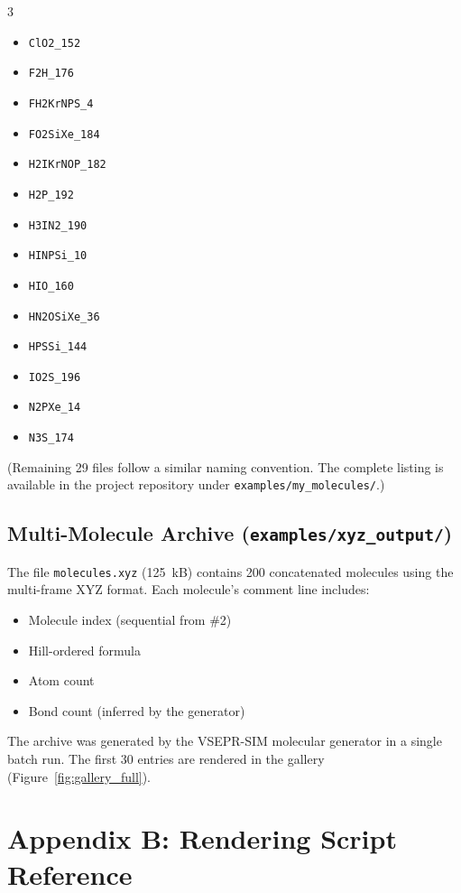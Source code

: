 \documentclass[11pt,a4paper]{article}
\begin{document}
\begin{multicols}{3}
\begin{itemize}[nosep,leftmargin=1em]
  \item \texttt{ClO2\_152}
  \item \texttt{F2H\_176}
  \item \texttt{FH2KrNPS\_4}
  \item \texttt{FO2SiXe\_184}
  \item \texttt{H2IKrNOP\_182}
  \item \texttt{H2P\_192}
  \item \texttt{H3IN2\_190}
  \item \texttt{HINPSi\_10}
  \item \texttt{HIO\_160}
  \item \texttt{HN2OSiXe\_36}
  \item \texttt{HPSSi\_144}
  \item \texttt{IO2S\_196}
  \item \texttt{N2PXe\_14}
  \item \texttt{N3S\_174}
\end{itemize}
\end{multicols}

\noindent (Remaining 29 files follow a similar naming convention.  The
complete listing is available in the project repository under
\texttt{examples/my\_molecules/}.)

\subsection{Multi-Molecule Archive (\texttt{examples/xyz\_output/})}

The file \texttt{molecules.xyz} (125~kB) contains 200 concatenated
molecules using the multi-frame XYZ format.  Each molecule's comment
line includes:

\begin{itemize}
  \item Molecule index (sequential from \#2)
  \item Hill-ordered formula
  \item Atom count
  \item Bond count (inferred by the generator)
\end{itemize}

\noindent The archive was generated by the VSEPR-SIM molecular generator
in a single batch run.  The first 30 entries are rendered in the gallery
(Figure~\ref{fig:gallery_full}).

\section{Appendix B: Rendering Script Reference}
\label{sec:appendix_render}
\end{document}
